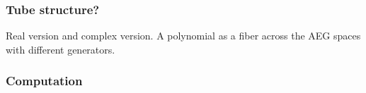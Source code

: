 \documentclass[aspectratio=169]{beamer}
\begin{document}
\begin{frame}
    \frametitle{Tube structure?}
    \begin{figure}[ht]\centering
    \end{figure}
    Real version and complex version.
    A polynomial as a fiber across the AEG spaces with different generators.
\end{frame}

\begin{frame}
    \frametitle{Computation}
    \begin{figure}[ht]\centering
    \end{figure}
\end{frame}
\end{document}
